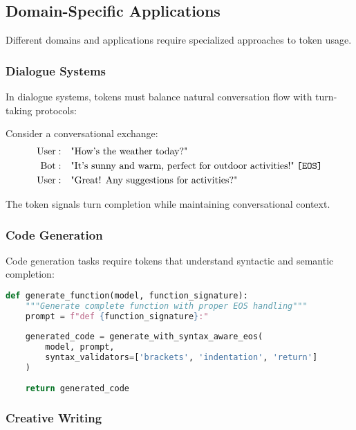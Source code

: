 \subsection{Domain-Specific \eos{} Applications}

Different domains and applications require specialized approaches to \eos{} token usage.

\subsubsection{Dialogue Systems}

In dialogue systems, \eos{} tokens must balance natural conversation flow with turn-taking protocols:

\begin{example}
Consider a conversational exchange:
\begin{align}
\text{User}: &\quad \text{"How's the weather today?"} \\
\text{Bot}: &\quad \text{"It's sunny and warm, perfect for outdoor activities!"} \; \texttt{[EOS]}{} \\
\text{User}: &\quad \text{"Great! Any suggestions for activities?"}
\end{align}

The \eos{} token signals turn completion while maintaining conversational context.
\end{example}

\subsubsection{Code Generation}

Code generation tasks require \eos{} tokens that understand syntactic and semantic completion:

\begin{lstlisting}[language=Python, caption=Code generation with syntactic \eos{}]
def generate_function(model, function_signature):
    """Generate complete function with proper EOS handling"""
    prompt = f"def {function_signature}:"
    
    generated_code = generate_with_syntax_aware_eos(
        model, prompt, 
        syntax_validators=['brackets', 'indentation', 'return']
    )
    
    return generated_code
\end{lstlisting}

\subsubsection{Creative Writing}

